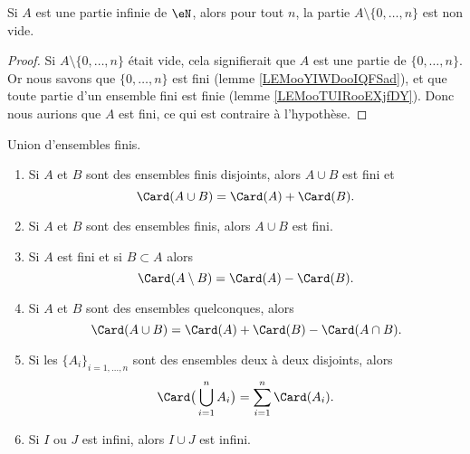 \begin{lemma}       \label{LEMooRWUDooTgoRXH}
	Si \( A\) est une partie infinie de \( \eN\), alors pour tout \( n\), la partie \( A\setminus\{ 0,\ldots, n \}\) est non vide.
\end{lemma}

\begin{proof}
	Si \( A\setminus\{ 0,\ldots, n \}\) était vide, cela signifierait que \( A\) est une partie de \( \{ 0,\ldots, n \}\). Or nous savons que \( \{ 0,\ldots, n \}\) est fini (lemme \ref{LEMooYIWDooIQFSad}), et que toute partie d'un ensemble fini est finie (lemme \ref{LEMooTUIRooEXjfDY}). Donc nous aurions que \( A\) est fini, ce qui est contraire à l'hypothèse.
\end{proof}


\begin{lemma}       \label{LEMooVFPNooVmdUXY}
	Union d'ensembles finis.
	\begin{enumerate}
		\item       \label{ITEMooBUCZooYLCuIe}
		      Si \( A\) et \( B\) sont des ensembles finis disjoints, alors \( A\cup B\) est fini et
		      \begin{equation}
			      \Card(A\cup B)=\Card(A) + \Card(B).
		      \end{equation}
		\item       \label{ITEMooCCWOooYwgGBp}
		      Si \( A\) et \( B\) sont des ensembles finis, alors \( A\cup B\) est fini.
		\item       \label{ITEMooYJSZooXQXkOX}
		      Si \( A\) est fini et si \( B\subset A\) alors
		      \begin{equation}
			      \Card(A\setminus B)=\Card(A)-\Card(B).
		      \end{equation}
		\item       \label{ITEMooSWJCooEpBVkG}
		      Si \( A\) et \( B\) sont des ensembles quelconques, alors
		      \begin{equation}
			      \Card(A\cup B)=\Card(A)+\Card(B)-\Card(A\cap B).
		      \end{equation}
		\item       \label{ITEMooJDUUooVMvAOn}
		      Si les \( \{ A_i \}_{i=1,\ldots, n}\) sont des ensembles deux à deux disjoints, alors
		      \begin{equation}
			      \Card\big( \bigcup_{i=1}^nA_i \big)=\sum_{i=1}^n\Card(A_i).
		      \end{equation}
		\item \label{ITEMooNMFSooBvsNyq}
		      Si \( I\) ou \( J\) est infini, alors \( I \cup J\) est infini.
	\end{enumerate}
\end{lemma}

